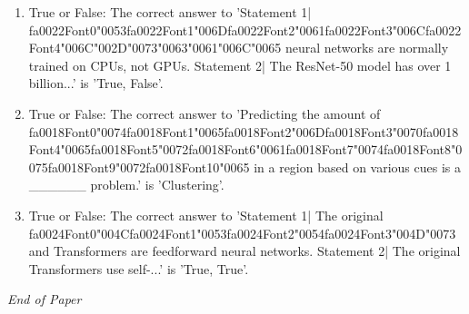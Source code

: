 \documentclass[12pt]{article}
\begin{document}
\begin{enumerate}[label=\arabic*.]
\item True or False: The correct answer to 'Statement 1| {\csname fa0022Font0\endcsname\char"0053}{\csname fa0022Font1\endcsname\char"006D}{\csname fa0022Font2\endcsname\char"0061}{\csname fa0022Font3\endcsname\char"006C}{\csname fa0022Font4\endcsname\char"006C}{\char"002D}{\char"0073}{\char"0063}{\char"0061}{\char"006C}{\char"0065} neural networks are normally trained on CPUs, not GPUs. Statement 2| The ResNet-50 model has over 1 billion...' is 'True, False'.
\item True or False: The correct answer to 'Predicting the amount of {\csname fa0018Font0\endcsname\char"0074}{\csname fa0018Font1\endcsname\char"0065}{\csname fa0018Font2\endcsname\char"006D}{\csname fa0018Font3\endcsname\char"0070}{\csname fa0018Font4\endcsname\char"0065}{\csname fa0018Font5\endcsname\char"0072}{\csname fa0018Font6\endcsname\char"0061}{\csname fa0018Font7\endcsname\char"0074}{\csname fa0018Font8\endcsname\char"0075}{\csname fa0018Font9\endcsname\char"0072}{\csname fa0018Font10\endcsname\char"0065} in a region based on various cues is a \_\_\_\_\_\_ problem.' is 'Clustering'.
\item True or False: The correct answer to 'Statement 1| The original {\csname fa0024Font0\endcsname\char"004C}{\csname fa0024Font1\endcsname\char"0053}{\csname fa0024Font2\endcsname\char"0054}{\csname fa0024Font3\endcsname\char"004D}{\char"0073} and Transformers are feedforward neural networks. Statement 2| The original Transformers use self-...' is 'True, True'.
\end{enumerate}

\vfill
\noindent\textit{End of Paper}
\end{document}
